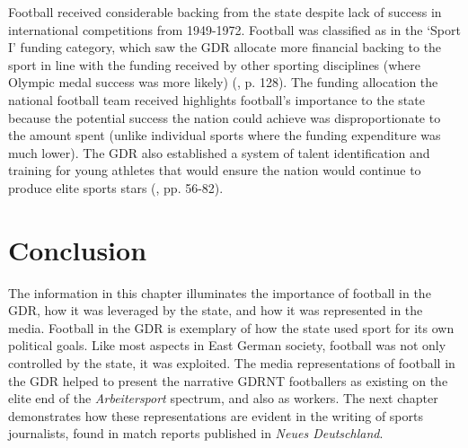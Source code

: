 Football received considerable backing from the state despite lack of success in international competitions from 1949-1972. Football was classified as in the ‘Sport I’ funding category, which saw the GDR allocate more financial backing to the sport in line with the funding received by other sporting disciplines (where Olympic medal success was more likely) (\cite{dennisgrix2012}, p. 128). The funding allocation the national football team received highlights football’s importance to the state because the potential success the nation could achieve was disproportionate to the amount spent (unlike individual sports where the funding expenditure was much lower). The GDR also established a system of talent identification and training for young athletes that would ensure the nation would continue to produce elite sports stars (\cite{dennisgrix2012}, pp. 56-82).

\section*{Conclusion}

The information in this chapter illuminates the importance of football in the GDR, how it was leveraged by the state, and how it was represented in the media. Football in the GDR is exemplary of how the state used sport for its own political goals. Like most aspects in East German society, football was not only controlled by the state, it was exploited. The media representations of football in the GDR helped to present the narrative GDRNT footballers as existing on the elite end of the \textit{Arbeitersport} spectrum, and also as workers. The next chapter demonstrates how these representations are evident in the writing of sports journalists, found in match reports published in \textit{Neues Deutschland}.